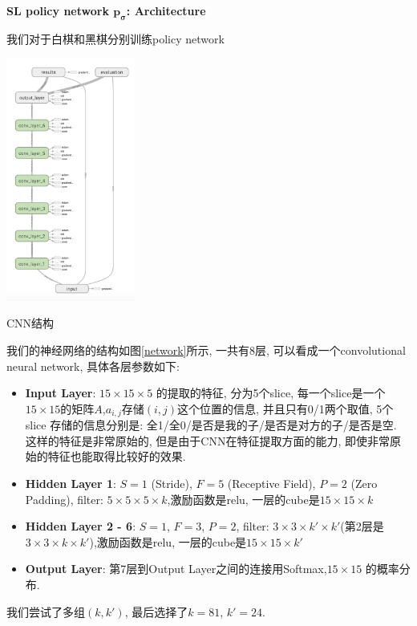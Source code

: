 \documentclass[twocolumn]{article}
\begin{document}
\noindent \textbf{SL policy network $\bm{p_\sigma}$: Architecture}

我们对于白棋和黑棋分别训练policy network

\begin{center}
\makeatletter
\def\@captype{figure}
\makeatother
\includegraphics [height=8cm]{network}
\caption{CNN结构}
\label{network}
\end{center}

我们的神经网络的结构如图\ref{network}所示, 一共有8层, 可以看成一个convolutional neural network, 具体各层参数如下: 

\begin{itemize}
	\item \textbf{Input Layer}: $15 \times 15 \times 5$ 的提取的特征, 分为5个slice, 每一个slice是一个$15 \times 15$的矩阵$A$,$a_{i,j}$存储$(i, j)$这个位置的信息, 并且只有0/1两个取值, 5个slice 存储的信息分别是: 全1/全0/是否是我的子/是否是对方的子/是否是空. 这样的特征是非常原始的, 但是由于CNN在特征提取方面的能力, 即使非常原始的特征也能取得比较好的效果. 
	\item \textbf{Hidden Layer 1}: $S = 1$ (Stride), $F = 5$ (Receptive Field), $P = 2$ (Zero Padding), filter: $5 \times 5 \times 5 \times k$,激励函数是relu, 一层的cube是$15 \times 15 \times k$
	\item \textbf{Hidden Layer 2 - 6}: $S = 1$, $F = 3$, $P = 2$, filter: $3 \times 3 \times k' \times k'$(第2层是$3 \times 3 \times k \times k'$),激励函数是relu, 一层的cube是$15 \times 15 \times k'$
	\item \textbf{Output Layer}: 第7层到Output Layer之间的连接用Softmax,$15 \times 15$ 的概率分布.
\end{itemize}

我们尝试了多组$(k, k')$, 最后选择了$k = 81$, $k' = 24$.
\end{document}

